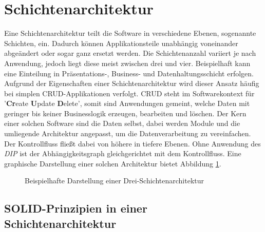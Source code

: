 \documentclass[conference]{IEEEtran}
\begin{document}


\section{Schichtenarchitektur}

Eine Schichtenarchitektur teilt die Software in verschiedene Ebenen, sogenannte Schichten, ein. Dadurch können Applikationsteile unabhängig voneinander abgeändert oder sogar ganz ersetzt werden. Die Schichtenanzahl variiert je nach Anwendung, jedoch liegt diese meist zwischen drei und vier. Beispielhaft kann eine Einteilung in Präsentations-, Business- und Datenhaltungsschicht erfolgen. Aufgrund der Eigenschaften einer Schichtenarchitektur wird dieser Ansatz häufig bei simplen CRUD-Applikationen verfolgt. CRUD steht im Softwarekontext für '\textbf{Cr}eate \textbf{U}pdate \textbf{D}elete', somit sind Anwendungen gemeint, welche Daten mit geringer bis keiner Businesslogik erzeugen, bearbeiten und löschen. Der Kern einer solchen Software sind die Daten selbst, dabei werden Module und die umliegende Architektur angepasst, um die Datenverarbeitung zu vereinfachen. Der Kontrollfluss fließt dabei von höhere in tiefere Ebenen. Ohne Anwendung des \emph{DIP} ist der Abhängigkeitsgraph gleichgerichtet mit dem Kontrollfluss. Eine graphische Darstellung einer solchen Architektur bietet Abbildung \ref{fig:Schichtenarchitektur}. \cite{Buschmann.2013} \cite{layer.solid}


\begin{figure}[htbp]
	\small
	
	\caption{Beispielhafte Darstellung einer Drei-Schichtenarchitektur}
	\label{fig:Schichtenarchitektur}
\end{figure}


\subsection{SOLID-Prinzipien in einer Schichtenarchitektur}
\end{document}
